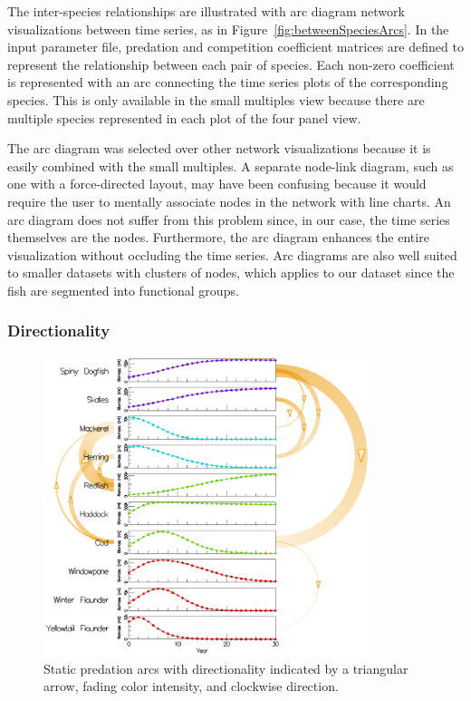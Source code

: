 The inter-species relationships are illustrated with arc diagram network visualizations between time series, as in Figure~\ref{fig:betweenSpeciesArcs}.  In the input parameter file, predation and competition coefficient matrices are defined to represent the relationship between each pair of species.  Each non-zero coefficient is represented with an arc connecting the time series plots of the corresponding species.  This is only available in the small multiples view because there are multiple species represented in each plot of the four panel view.

The arc diagram was selected over other network visualizations because it is easily combined with the small multiples.  A separate node-link diagram, such as one with a force-directed layout, may have been confusing because it would require the user to mentally associate nodes in the network with line charts.  An arc diagram does not suffer from this problem since, in our case, the time series themselves are the nodes.  Furthermore, the arc diagram enhances the entire visualization without occluding the time series.  Arc diagrams are also well suited to smaller datasets with clusters of nodes, which applies to our dataset since the fish are segmented into functional groups.

\subsubsection{Directionality}

\begin{figure}[h]
	\centering
	\includegraphics[width=0.85\textwidth]{figures/eps/arcs_directionality.eps}
	\caption{Static predation arcs with directionality indicated by a triangular arrow, fading color intensity, and clockwise direction.}
	\label{fig:arcs_directionality}
\end{figure}

